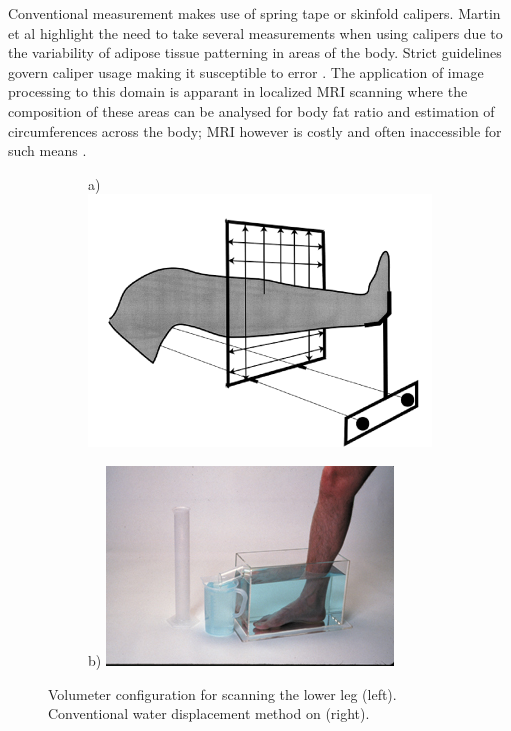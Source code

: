 Conventional measurement makes use of spring tape or skinfold calipers. Martin et al highlight the need to take several measurements when using calipers due to the variability of adipose tissue patterning in areas of the body. Strict guidelines govern caliper usage making it susceptible to error \cite{Martin1985}. The application of image processing to this domain is apparant in localized MRI scanning where the composition of these areas can be analysed for body fat ratio and estimation of circumferences across the body; MRI however is costly and often inaccessible for such means \cite{Reeves2004}. \\

\begin{figure}[t]
\centering
        \begin{subfigure}(a)
            \label{volLED}
            \centering
            \includegraphics[scale=0.4]{images/volumetry.PNG}
            \end{subfigure}
            \begin{subfigure}(b)
                \label{volWATER}
                \centering
                \includegraphics[scale=0.4]{images/waterdisplacement.jpg}
        \end{subfigure}
        \caption{Volumeter configuration for scanning the lower leg (left). Conventional water displacement method on (right).}
\end{figure} \\

